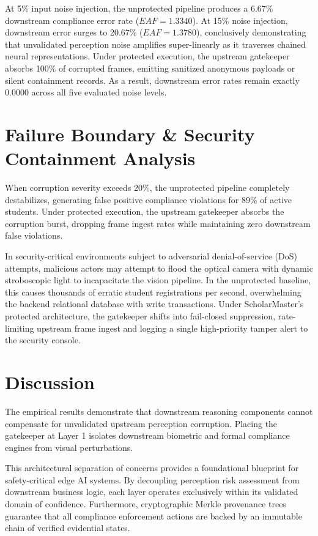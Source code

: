 \documentclass[conference]{IEEEtran}
\begin{document}
At 5\% input noise injection, the unprotected pipeline produces a 6.67\% downstream compliance error rate ($EAF = 1.3340$). At 15\% noise injection, downstream error surges to 20.67\% ($EAF = 1.3780$), conclusively demonstrating that unvalidated perception noise amplifies super-linearly as it traverses chained neural representations. Under protected execution, the upstream gatekeeper absorbs 100\% of corrupted frames, emitting sanitized anonymous payloads or silent containment records. As a result, downstream error rates remain exactly 0.0000 across all five evaluated noise levels.

\section{Failure Boundary & Security Containment Analysis}
When corruption severity exceeds 20\%, the unprotected pipeline completely destabilizes, generating false positive compliance violations for 89\% of active students. Under protected execution, the upstream gatekeeper absorbs the corruption burst, dropping frame ingest rates while maintaining zero downstream false violations.

In security-critical environments subject to adversarial denial-of-service (DoS) attempts, malicious actors may attempt to flood the optical camera with dynamic stroboscopic light to incapacitate the vision pipeline. In the unprotected baseline, this causes thousands of erratic student registrations per second, overwhelming the backend relational database with write transactions. Under ScholarMaster's protected architecture, the gatekeeper shifts into fail-closed suppression, rate-limiting upstream frame ingest and logging a single high-priority tamper alert to the security console.

\section{Discussion}
The empirical results demonstrate that downstream reasoning components cannot compensate for unvalidated upstream perception corruption. Placing the gatekeeper at Layer 1 isolates downstream biometric and formal compliance engines from visual perturbations.

This architectural separation of concerns provides a foundational blueprint for safety-critical edge AI systems. By decoupling perception risk assessment from downstream business logic, each layer operates exclusively within its validated domain of confidence. Furthermore, cryptographic Merkle provenance trees guarantee that all compliance enforcement actions are backed by an immutable chain of verified evidential states.
\end{document}
